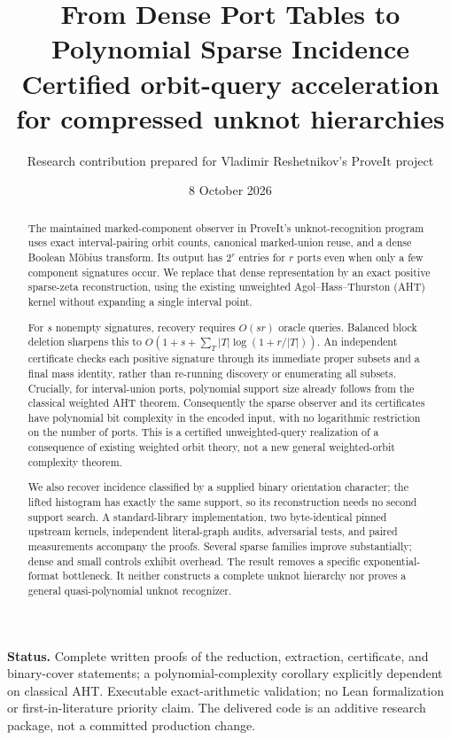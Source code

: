 \documentclass[11pt,letterpaper]{article}
\title{\textbf{From Dense Port Tables to Polynomial Sparse Incidence}\\[0.5em]
\large Certified orbit-query acceleration for compressed unknot hierarchies}
\author{Research contribution prepared for Vladimir Reshetnikov's ProveIt project}
\date{8 October 2026}
\begin{document}
\maketitle
\begin{abstract}
The maintained marked-component observer in ProveIt's unknot-recognition
program uses exact interval-pairing orbit counts, canonical marked-union reuse,
and a dense Boolean M\"obius transform. Its output has $2^r$ entries for $r$
ports even when only a few component signatures occur. We replace that dense
representation by an exact positive sparse-zeta reconstruction, using the
existing unweighted Agol--Hass--Thurston (AHT) kernel without expanding a
single interval point.

For $s$ nonempty signatures, recovery requires $O(sr)$ oracle queries. Balanced
block deletion sharpens this to
$O(1+s+\sum_T |T|\log(1+r/|T|))$.
An independent certificate checks each positive signature through its immediate
proper subsets and a final mass identity, rather than re-running discovery or
enumerating all subsets. Crucially, for interval-union ports, polynomial support
size already follows from the classical weighted AHT theorem. Consequently the
sparse observer and its certificates have polynomial bit complexity in the
encoded input, with no logarithmic restriction on the number of ports. This is
a certified unweighted-query realization of a consequence of existing weighted
orbit theory, not a new general weighted-orbit complexity theorem.

We also recover incidence classified by a supplied binary orientation character;
the lifted histogram has exactly the same support, so its reconstruction needs
no second support search. A standard-library implementation, two byte-identical
pinned upstream kernels, independent literal-graph audits, adversarial tests,
and paired measurements accompany the proofs. Several sparse families improve
substantially; dense and small controls exhibit overhead. The result removes a
specific exponential-format bottleneck. It neither constructs a complete
unknot hierarchy nor proves a general quasi-polynomial unknot recognizer.
\end{abstract}

\vspace{0.5em}
\textbf{Status.} Complete written proofs of the reduction, extraction,
certificate, and binary-cover statements; a polynomial-complexity corollary
explicitly dependent on classical AHT. Executable exact-arithmetic validation;
no Lean formalization or first-in-literature priority claim. The delivered
code is an additive research package, not a committed production change.
\newpage
\tableofcontents
\newpage
\end{document}
